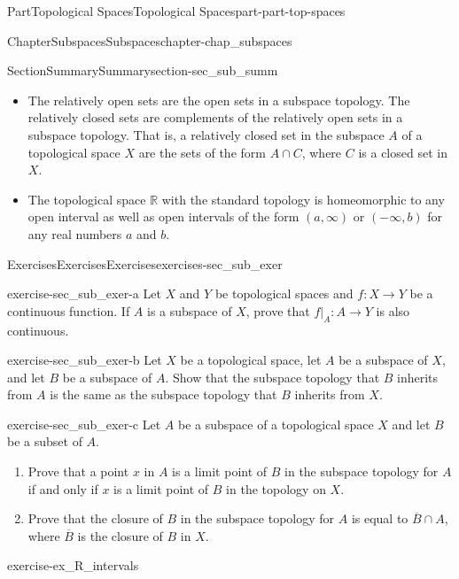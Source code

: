 \documentclass[oneside,10pt,]{book}
\numberwithin{equation}{chapter}
\newcommand{\R}{\mathbb{R}}
\begin{document}
\begin{partptx}{Part}{Topological Spaces}{}{Topological Spaces}{}{}{part-part-top-spaces}
\begin{chapterptx}{Chapter}{Subspaces}{}{Subspaces}{}{}{chapter-chap_subspaces}
\begin{sectionptx}{Section}{Summary}{}{Summary}{}{}{section-sec_sub_summ}
\begin{itemize}[label=\textbullet]
\item{}The relatively open sets are the open sets in a subspace topology. The relatively closed sets are complements of the relatively open sets in a subspace topology. That is, a relatively closed set in the subspace \(A\) of a topological space \(X\) are the sets of the form \(A \cap C\), where \(C\) is a closed set in \(X\).%
\item{}The topological space \(\R\) with the standard topology is homeomorphic to any open interval as well as open intervals of the form \((a,\infty)\) or \((-\infty,b)\) for any real numbers \(a\) and \(b\).%
\end{itemize}
%
\end{sectionptx}
%
%
\typeout{************************************************}
\typeout{************************************************}
%
\begin{exercises-section}{Exercises}{Exercises}{}{Exercises}{}{}{exercises-sec_sub_exer}
\begin{divisionexercise}{1}{}{}{exercise-sec_sub_exer-a}%
Let \(X\) and \(Y\) be topological spaces and \(f: X \to Y\) be a continuous function. If \(A\) is a subspace of \(X\), prove that \(f|_A : A \to Y\) is also continuous.%
\end{divisionexercise}%
\begin{divisionexercise}{2}{}{}{exercise-sec_sub_exer-b}%
Let \(X\) be a topological space, let \(A\) be a subspace of \(X\), and let \(B\) be a subspace of \(A\). Show that the subspace topology that \(B\) inherits from \(A\) is the same as the subspace topology that \(B\) inherits from \(X\).%
\end{divisionexercise}%
\begin{divisionexercise}{3}{}{}{exercise-sec_sub_exer-c}%
Let \(A\) be a subspace of a topological space \(X\) and let \(B\) be a subset of \(A\).%
\begin{enumerate}[font=\bfseries,label=(\alph*),ref=\alph*]%
\item{}Prove that a point \(x\) in \(A\) is a limit point of \(B\) in the subspace topology for \(A\) if and only if \(x\) is a limit point of \(B\) in the topology on \(X\).%
\item{}Prove that the closure of \(B\) in the subspace topology for \(A\) is equal to \(\overline{B} \cap A\), where \(\overline{B}\) is the closure of \(B\) in \(X\).%
\end{enumerate}%
\end{divisionexercise}%
\begin{divisionexercise}{4}{}{}{exercise-ex_R_intervals}%

\end{divisionexercise}
\end{exercises-section}
\end{chapterptx}
\end{partptx}
\end{document}
